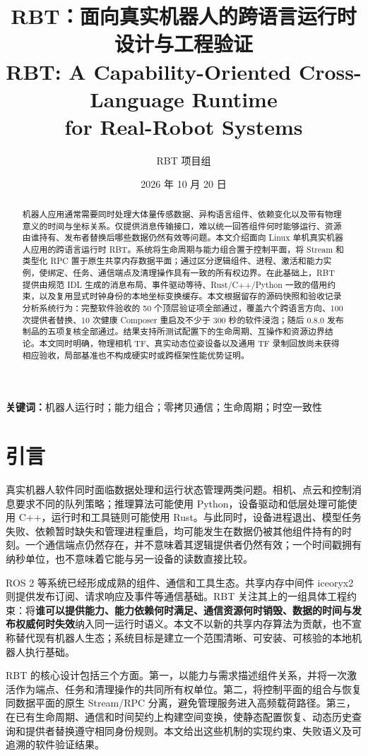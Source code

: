 \documentclass[UTF8,fontset=none,zihao=-4,a4paper]{ctexart}
\title{\vspace{-1.4em}\sffamily\bfseries\LARGE RBT：面向真实机器人的跨语言运行时\\[0.25em]设计与工程验证\\[0.55em]\large\sffamily RBT: A Capability-Oriented Cross-Language Runtime\\for Real-Robot Systems}
\author{RBT 项目组}
\date{2026 年 10 月 20 日}
\begin{document}
\maketitle
\thispagestyle{fancy}

\begin{abstract}
机器人应用通常需要同时处理大体量传感数据、异构语言组件、依赖变化以及带有物理意义的时间与坐标关系。仅提供消息传输接口，难以统一回答组件何时能够运行、资源由谁持有、发布者替换后哪些数据仍然有效等问题。本文介绍面向 Linux 单机真实机器人应用的跨语言运行时 RBT。系统将生命周期与能力组合置于控制平面，将 Stream 和类型化 RPC 置于原生共享内存数据平面；通过区分逻辑组件、进程、激活和能力实例，使绑定、任务、通信端点及清理操作具有一致的所有权边界。在此基础上，RBT 提供由规范 IDL 生成的消息布局、事件驱动等待、Rust/C++/Python 一致的借用约束，以及复用显式时钟身份的本地坐标变换缓存。本文根据留存的源码快照和验收记录分析系统行为：完整软件验收的 50 个顶层验证项全部通过，覆盖六个跨语言方向、100 次提供者替换、10 次健康 Composer 重启及不少于 300 秒的软件浸泡；随后 0.8.0 发布制品的五项复核全部通过。结果支持所测试配置下的生命周期、互操作和资源边界结论。本文同时明确，物理相机 TF、真实动态位姿设备以及通用 TF 录制回放尚未获得相应验收，局部基准也不构成硬实时或跨框架性能优势证明。
\end{abstract}
\noindent\textbf{关键词：}机器人运行时；能力组合；零拷贝通信；生命周期；时空一致性

\section{引言}
真实机器人软件同时面临数据处理和运行状态管理两类问题。相机、点云和控制消息要求不同的队列策略；推理算法可能使用 Python，设备驱动和低层处理可能使用 C++，运行时和工具链则可能使用 Rust。与此同时，设备进程退出、模型任务失败、依赖暂时缺失和管理进程重启，均可能发生在数据仍被其他组件持有的时刻。一个通信端点仍然存在，并不意味着其逻辑提供者仍然有效；一个时间戳拥有纳秒单位，也不意味着它能与另一设备的读数直接比较。

ROS 2 等系统已经形成成熟的组件、通信和工具生态\cite{ros2}。共享内存中间件 iceoryx2 则提供发布订阅、请求响应及事件等通信基础\cite{iceoryx2}。RBT 关注其上的一组具体工程约束：将\textbf{谁可以提供能力、能力依赖何时满足、通信资源何时销毁、数据的时间与发布权威何时失效}纳入同一运行时语义。本文不以新的共享内存算法为贡献，也不宣称替代现有机器人生态；系统目标是建立一个范围清晰、可安装、可核验的本地机器人执行基础。

RBT 的核心设计包括三个方面。第一，以能力与需求描述组件关系，并将一次激活作为端点、任务和清理操作的共同所有权单位。第二，将控制平面的组合与恢复同数据平面的原生 Stream/RPC 分离，避免管理服务进入高频载荷路径。第三，在已有生命周期、通信和时间契约上构建空间变换，使静态配置恢复、动态历史查询和提供者替换遵守相同身份规则。本文给出这些机制的实现约束、失败语义及可追溯的软件验证结果。
\end{document}

